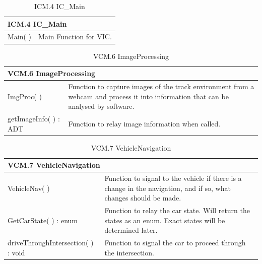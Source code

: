 \documentclass [10pt]{article}
\begin{document}
\begin{longtable}{| p{ } | p{ } | }\caption{ICM.4 IC\_Main} \\\hline  
 \multicolumn{2}{|l|}{\textbf {ICM.4 IC\_Main}}\\ \hline
 
\cellcolor{tableCell}Main( ) & \cellcolor{tableCell}Main Function for VIC. \\ \hline 




\end{longtable}


\begin{longtable}{| p{ } | p{ } | }\caption{VCM.6 ImageProcessing} \\\hline  
 \multicolumn{2}{|l|}{\textbf {VCM.6 ImageProcessing}}\\ \hline
\cellcolor{tableCell}ImgProc( ) & \cellcolor{tableCell}Function to capture images of the track environment from a webcam and process it into information that can be analysed by software.  \\ \hline 

getImageInfo( ) : ADT & Function to relay image information when called.  \\ \hline 


\end{longtable}

\begin{longtable}{| p{ } | p{ } | }\caption{VCM.7 VehicleNavigation} \\\hline  
 \multicolumn{2}{|l|}{\textbf {VCM.7 VehicleNavigation}}\\ \hline
\cellcolor{tableCell}VehicleNav( ) & \cellcolor{tableCell}Function to signal to the vehicle if there is a change in the navigation, and if so, what changes should be made. \\ \hline 

GetCarState( ) : enum &Function to relay the car state. Will return the states as an enum. Exact states will be determined later. \\ \hline 

\cellcolor{tableCell}driveThroughIntersection( ) : void & \cellcolor{tableCell}Function to signal the car to proceed through the intersection. 
\\ \hline

\end{longtable}
\end{document}

